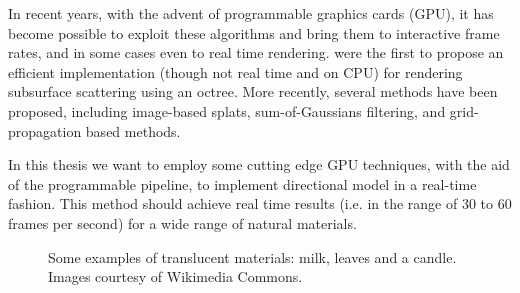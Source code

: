 \documentclass[12pt, twoside,a4paper]{article}
\begin{document}
In recent years, with the advent of programmable graphics cards (GPU), it has become possible to exploit these algorithms and bring them to interactive frame rates, and in some cases even to real time rendering. \cite{Jensen:2002:RHR:566654.566619} were the first to propose an efficient implementation (though not real time and on CPU) for rendering subsurface scattering using an octree. More recently, several methods have been proposed, including image-based splats, sum-of-Gaussians filtering, and grid-propagation based methods.

In this thesis we want to employ some cutting edge GPU techniques, with the aid of the programmable pipeline, to implement \citeauthor{IMM2013-06646} directional model in a real-time fashion. This method should achieve real time results (i.e. in the range of 30 to 60 frames per second) for a wide range of natural materials.

\begin{figure}
\centering
{}
\caption{Some examples of translucent materials: milk, leaves and a candle. Images courtesy of Wikimedia Commons.}
\label{fig:ex1}
\end{figure}
\FloatBarrier



\end{document}
